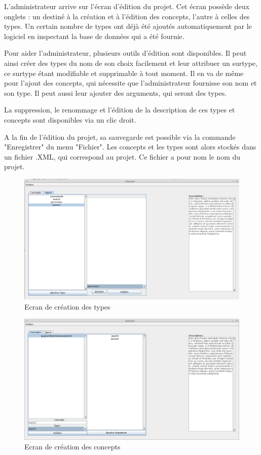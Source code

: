 \documentclass[12pt]{report}
\begin{document}
L'administrateur arrive sur l'écran d'édition du projet.
Cet écran possède deux onglets : un destiné à la création et à l'édition des concepts, l'autre à celles des types. Un certain nombre de types ont déjà été ajoutés automatiquement par le logiciel en inspectant la base de données qui a été fournie.

Pour aider l'administrateur, plusieurs outils d'édition sont disponibles.
Il peut ainsi créer des types du nom de son choix facilement et leur attribuer un surtype, ce surtype étant modifiable et supprimable à tout moment. 
Il en va de même pour l'ajout des concepts, qui nécessite que l'administrateur fournisse son nom et son type. Il peut aussi leur ajouter des arguments, qui seront des types.

La suppression, le renommage et l'édition de la description de ces types et concepts sont disponibles via un clic droit.

A la fin de l'édition du projet, sa sauvegarde est possible via la commande "Enregistrer" du menu "Fichier". Les concepts et les types sont alors stockés dans un fichier .XML, qui correspond au projet. Ce fichier a pour nom le nom du projet.

\begin{figure}[h!]
\centering
\includegraphics[scale=0.3]{IHM/creation_types.png}
\caption{Ecran de création des types}
\end{figure}

\begin{figure}
\centering
\includegraphics[scale=0.3]{IHM/creation_concepts.png}
\caption{Ecran de création des concepts}
\end{figure}
\end{document}
